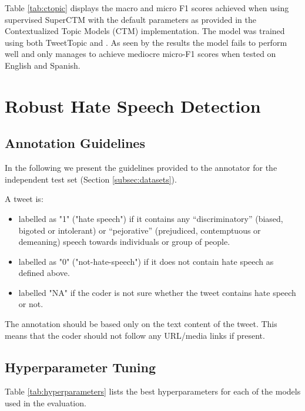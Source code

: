 Table \ref{tab:ctopic} displays the macro and micro F1 scores achieved when using supervised SuperCTM  \cite{card2017neural} with the default parameters as provided in the Contextualized Topic Models (CTM) \cite{bianchi-etal-2021-cross} implementation. The model was trained using both TweetTopic and {\XTOPIC}. As seen by the results the model fails to perform well and only manages to achieve mediocre micro-F1 scores when tested on English and Spanish.

\section{Robust Hate Speech Detection}

\subsection{Annotation Guidelines}
\label{appendix:Hate-annotation_guidelines}

In the following we present the guidelines provided to the annotator for the independent test set (Section \ref{subsec:datasets}).

A tweet is:

\begin{itemize}
    \item labelled as "1" ("hate speech") if it contains any “discriminatory” (biased, bigoted or intolerant) or “pejorative” (prejudiced, contemptuous or demeaning) speech towards individuals or group of people.
    \item labelled as "0" ("not-hate-speech") if it does not contain hate speech as defined above.
    \item labelled "NA" if the coder is not sure whether the tweet contains hate speech or not.
\end{itemize}

The annotation should be based only on the text content of the tweet. This means that the coder should not follow any URL/media links if present.

\subsection{Hyperparameter Tuning}\label{appendix:Hate-tuning}

Table \ref{tab:hyperparameters} lists the best hyperparameters for each of the models used in the evaluation.

